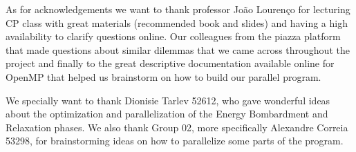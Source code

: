 As for acknowledgements we want to thank professor João Lourenço for lecturing CP class with great materials (recommended book and slides) and having a high availability to clarify questions online. Our colleagues from the piazza platform that made questions about similar dilemmas that we came across throughout the project and finally to the great descriptive documentation available online for OpenMP that helped us brainstorm on how to build our parallel program. 
\par We specially want to thank Dionisie Tarlev 52612, who gave wonderful ideas about the optimization and parallelization of the Energy Bombardment and Relaxation phases. We also thank Group 02, more specifically Alexandre Correia 53298, for brainstorming ideas on how to parallelize some parts of the program.